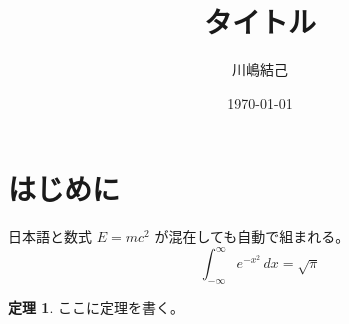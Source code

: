 \documentclass[11pt,a4paper]{ltjsarticle}
\title{タイトル}
\author{川嶋結己}
\date{\today}
\theoremstyle{definition}
\newtheorem{theorem}{定理}
\begin{document}
\maketitle

\section{はじめに}
日本語と数式 $E = mc^2$ が混在しても自動で組まれる。
\[
  \int_{-\infty}^{\infty} e^{-x^2}\,dx = \sqrt{\pi}
\]

\begin{theorem}
ここに定理を書く。
\end{theorem}
\end{document}
